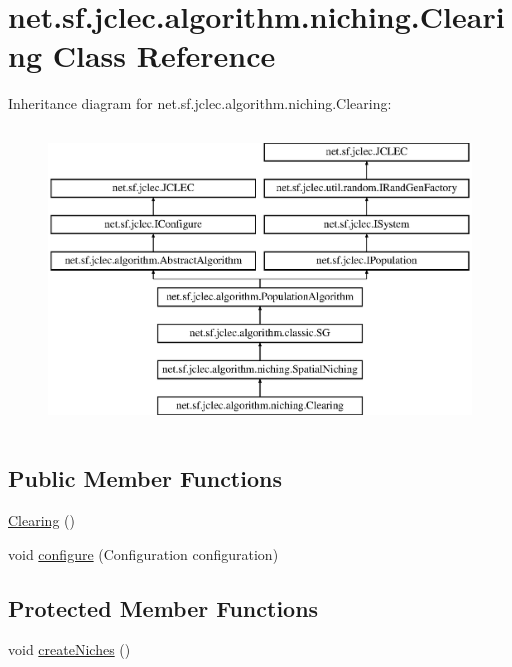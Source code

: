 \hypertarget{classnet_1_1sf_1_1jclec_1_1algorithm_1_1niching_1_1_clearing}{\section{net.\-sf.\-jclec.\-algorithm.\-niching.\-Clearing Class Reference}
\label{classnet_1_1sf_1_1jclec_1_1algorithm_1_1niching_1_1_clearing}
}
Inheritance diagram for net.\-sf.\-jclec.\-algorithm.\-niching.\-Clearing\-:\begin{figure}[H]
\begin{center}
\leavevmode
\includegraphics[height=8.000000cm]{classnet_1_1sf_1_1jclec_1_1algorithm_1_1niching_1_1_clearing}
\end{center}
\end{figure}
\subsection*{Public Member Functions}
\begin{DoxyCompactItemize}
\item 
\hyperlink{classnet_1_1sf_1_1jclec_1_1algorithm_1_1niching_1_1_clearing_a0e5ae5762d6d02fd9ad9d4bd5efa5ee1}{Clearing} ()
\item 
void \hyperlink{classnet_1_1sf_1_1jclec_1_1algorithm_1_1niching_1_1_clearing_a440e66f007b056d25542248a225492d2}{configure} (Configuration configuration)
\end{DoxyCompactItemize}
\subsection*{Protected Member Functions}
\begin{DoxyCompactItemize}
\item 
void \hyperlink{classnet_1_1sf_1_1jclec_1_1algorithm_1_1niching_1_1_clearing_a1df6eb4bbb13c57727a17612aa869210}{create\-Niches} ()
\end{DoxyCompactItemize}

